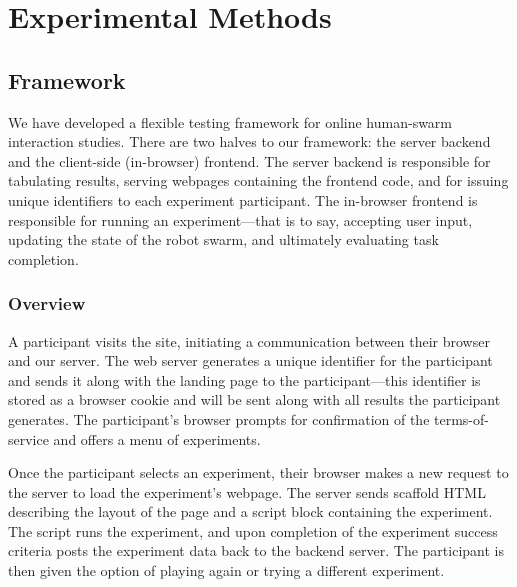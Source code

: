 \section{Experimental Methods}
\label{sec:expMethods}


\subsection{Framework}

We have developed a flexible testing framework for online human-swarm interaction studies. There are two halves to our framework: the server backend and the client-side (in-browser) frontend. The server backend is responsible for tabulating results, serving webpages containing the frontend code, and for issuing unique identifiers to each experiment participant. The in-browser frontend is responsible for running an experiment---that is to say, accepting user input, updating the state of the robot swarm, and ultimately evaluating task completion.

\subsubsection{Overview}

A participant visits the site, initiating a communication between their browser and our server. The web server generates a unique identifier for the participant and sends it along with the landing page to the participant---this identifier is stored as a browser cookie and will be sent along with all results the participant generates. The participant's browser prompts for confirmation of the terms-of-service and offers a menu of experiments.

Once the participant selects an experiment, their browser makes a new request to the server to load the experiment's webpage. The server sends scaffold HTML describing the layout of the page and a script block containing the experiment. The script runs the experiment, and upon completion of the experiment success criteria posts the experiment data back to the backend server. The participant is then given the option of playing again or trying a different experiment.

